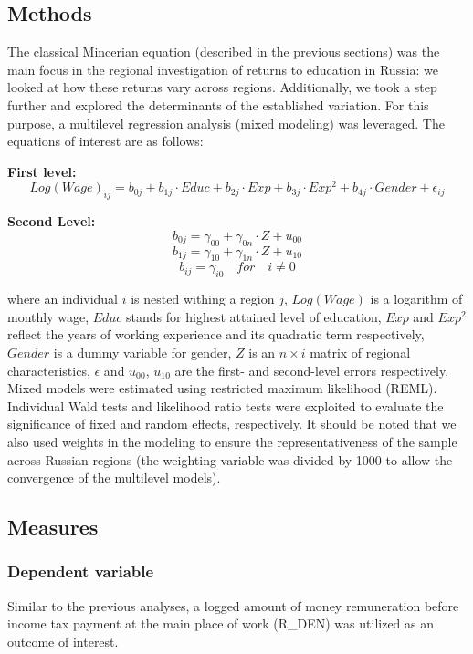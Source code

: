 \documentclass[12pt,a4paper]{article}
\numberwithin{equation}{section}
\begin{document}
\subsection{Methods}

The classical Mincerian equation (described in the previous sections) was the main focus in the regional investigation of returns to education in Russia: we looked at how these returns vary across regions. Additionally, we took a step further and explored the determinants of the established variation. For this purpose, a multilevel regression analysis (mixed modeling) was leveraged. The equations of interest are as follows:

\textbf{First level:}
$$Log(Wage)_{ij} = b_{0j} + b_{1j}\cdot Educ + b_{2j}\cdot Exp + b_{3j}\cdot Exp^2 + b_{4j}\cdot Gender + \epsilon_{ij}$$

\textbf{Second Level:}
$$b_{0j} = \gamma_{00} + \gamma_{0n}\cdot Z + u_{00}$$
$$b_{1j} = \gamma_{10} + \gamma_{1n}\cdot Z + u_{10} $$
$$b_{ij} = \gamma_{i0} \quad for \quad i \neq 0$$

\noindent
where an individual $i$ is nested withing a region $j$, $Log(Wage)$ is a logarithm of monthly wage, $Educ$ stands for highest attained level of education, $Exp$ and $Exp^2$ reflect the years of working experience and its quadratic term respectively, $Gender$ is a dummy variable for gender, $Z$ is an $n\times i$ matrix of regional characteristics, $\epsilon$ and $u_{00}$, $u_{10}$ are the first- and second-level errors respectively.
\\

Mixed models were estimated using restricted maximum likelihood (REML). Individual Wald tests and likelihood ratio tests were exploited to evaluate the significance of fixed and random effects, respectively. It should be noted that we also used weights in the modeling to ensure the representativeness of the sample across Russian regions (the weighting variable was divided by 1000 to allow the convergence of the multilevel models). 

\subsection{Measures}

\subsubsection{Dependent variable}
Similar to the previous analyses, a logged amount of money remuneration before income tax payment at the main place of work (R\_DEN) was utilized as an outcome of interest.
\end{document}
